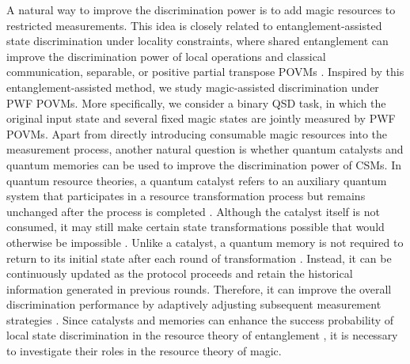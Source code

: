 \documentclass[aps,pra,twocolumn,floatfix,amsfonts,10pt]{revtex4-2}
\begin{document}
A natural way to improve the discrimination power is to add magic resources to restricted measurements. 
This idea is closely related to entanglement-assisted state discrimination under locality constraints, where shared entanglement can improve the discrimination power of local operations and classical communication, separable, or positive partial transpose POVMs \cite{C2008,BHN2016,ZZL+2025}. 
Inspired by this entanglement-assisted method, we study magic-assisted discrimination under PWF POVMs. 
More specifically, we consider a binary QSD task, in which the original input state and several fixed magic states are jointly measured by PWF POVMs. 
Apart from directly introducing consumable magic resources into the measurement process, another natural question is whether quantum catalysts and quantum memories can be used to improve the discrimination power of CSMs. 
In quantum resource theories, a quantum catalyst refers to an auxiliary quantum system that participates in a resource transformation process but remains unchanged after the process is completed \cite{DKM+2023,LWN2024}. 
Although the catalyst itself is not consumed, it may still make certain state transformations possible that would otherwise be impossible \cite{T2007,KDS2021,LS2021,TS2022,WL2026+}.
Unlike a catalyst, a quantum memory is not required to return to its initial state after each round of transformation \cite{KMR2005}. 
Instead, it can be continuously updated as the protocol proceeds and retain the historical information generated in previous rounds.  
Therefore, it can improve the overall discrimination performance by adaptively adjusting subsequent measurement strategies \cite{CDP2008,HHL+2010}. 
Since catalysts and memories can enhance the success probability of local state discrimination in the resource theory of entanglement \cite{YDY2012,SLN+2022,PS2025}, it is necessary to investigate their roles in the resource theory of magic.
\end{document}
